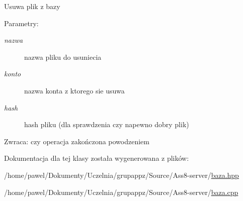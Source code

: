 Usuwa plik z bazy \begin{Desc}
\item[Parametry:]
\begin{description}
\item[{\em nazwa}]nazwa pliku do usuniecia \item[{\em konto}]nazwa konta z ktorego sie usuwa \item[{\em hash}]hash pliku (dla sprawdzenia czy napewno dobry plik) \end{description}
\end{Desc}
\begin{Desc}
\item[Zwraca:]czy operacja zakończona powodzeniem \end{Desc}


Dokumentacja dla tej klasy została wygenerowana z plików:\begin{CompactItemize}
\item 
/home/pawel/Dokumenty/Uczelnia/grupappz/Source/Ass8-server/\hyperlink{a00007}{baza.hpp}\item 
/home/pawel/Dokumenty/Uczelnia/grupappz/Source/Ass8-server/\hyperlink{a00006}{baza.cpp}\end{CompactItemize}
